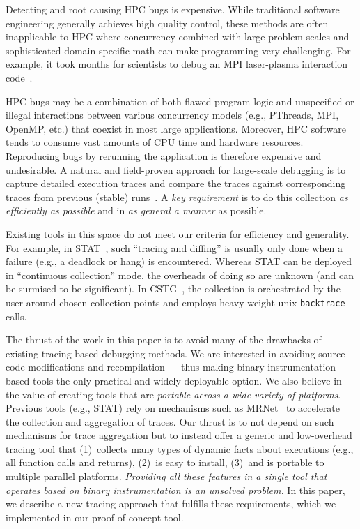 
Detecting and root causing HPC bugs is expensive. While traditional software engineering generally achieves high quality control, these methods are often inapplicable to HPC where concurrency combined with large problem scales and sophisticated domain-specific math can make programming very challenging. For example, it took months for scientists to debug an MPI laser-plasma interaction code~\cite{hpcdoe}.

HPC bugs may be a combination of both flawed program logic and unspecified or illegal interactions between various concurrency models (e.g., PThreads, MPI, OpenMP, etc.) that coexist in most large applications. Moreover, HPC software tends to consume vast amounts of CPU time and hardware resources. Reproducing bugs by rerunning the application is therefore expensive and undesirable. 
A natural and field-proven approach for large-scale debugging is to capture detailed execution traces and compare the traces against corresponding traces from previous (stable) runs~\cite{stat,cstg}.
%
A {\em key requirement} is to do this collection {\em as efficiently as possible}
and in {\em as general a manner} as possible.
%

Existing tools in this space
do not meet our criteria for efficiency and generality.
%
For example, in STAT~\cite{stat}, such ``tracing and diffing'' is usually only done
when a failure (e.g., a deadlock or hang) is encountered.
%
Whereas STAT can be deployed in ``continuous collection'' mode, the overheads of
doing so are unknown (and can be surmised to be significant).
%
In CSTG~\cite{cstg}, the collection is orchestrated by the
user around chosen collection points and employs heavy-weight
unix {\tt backtrace} calls.


The thrust of the work in this paper is to avoid many of the drawbacks of existing
tracing-based debugging methods.
%
We are interested in avoiding
source-code modifications and recompilation --- thus making binary
instrumentation-based tools the only practical and widely deployable option.
%
We also believe in the value
of creating tools that are {\em portable across a 
wide variety of platforms}.
%
Previous tools (e.g., STAT) rely on mechanisms such as
MRNet~\cite{mrnet} to accelerate the collection and aggregation of traces.
%
Our thrust is to not depend on such mechanisms for trace aggregation but to instead offer 
a generic and low-overhead tracing tool that 
(1)~collects many types of dynamic facts about executions (e.g., all function
calls and returns), 
(2)~is easy to install, 
(3)~and is portable to multiple parallel platforms.
%
{\em Providing all these features in a single tool
that operates based on binary instrumentation
is an unsolved problem.}
%
In this paper, we describe a new tracing approach that fulfills these requirements, which we implemented in our proof-of-concept \parlot tool.


